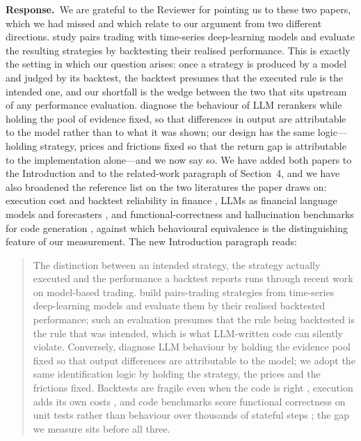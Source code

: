 \documentclass[11pt,a4paper]{article}
\newcommand{\response}{\par\noindent\textbf{Response.}\ }
\newenvironment{newtext}{\par\medskip\noindent\begin{quote}\small\color{blue!60!black}}{\end{quote}\par}
\begin{document}
\response We are grateful to the Reviewer for pointing us to these two papers, which we had missed and which relate to our argument from two different directions. \citet{yilmaz2026} study pairs trading with time-series deep-learning models and evaluate the resulting strategies by backtesting their realised performance. This is exactly the setting in which our question arises: once a strategy is produced by a model and judged by its backtest, the backtest presumes that the executed rule is the intended one, and our shortfall is the wedge between the two that sits upstream of any performance evaluation. \citet{arat2026} diagnose the behaviour of LLM rerankers while holding the pool of evidence fixed, so that differences in output are attributable to the model rather than to what it was shown; our design has the same logic---holding strategy, prices and frictions fixed so that the return gap is attributable to the implementation alone---and we now say so. We have added both papers to the Introduction and to the related-work paragraph of Section~4, and we have also broadened the reference list on the two literatures the paper draws on: execution cost and backtest reliability in finance \citep{almgren2001,harvey2016,gatev2006,bailey2014pseudo}, LLMs as financial language models and forecasters \citep{wu2023bloomberggpt,yang2023fingpt}, and functional-correctness and hallucination benchmarks for code generation \citep{chen2021humaneval,liu2023evalplus,jain2024livecodebench,tian2024codehalu,zhang2024hallucode}, against which behavioural equivalence is the distinguishing feature of our measurement. The new Introduction paragraph reads:
\begin{newtext}
The distinction between an intended strategy, the strategy actually executed and the performance a backtest reports runs through recent work on model-based trading. \citet{yilmaz2026} build pairs-trading strategies from time-series deep-learning models and evaluate them by their realised backtested performance; such an evaluation presumes that the rule being backtested is the rule that was intended, which is what LLM-written code can silently violate. Conversely, \citet{arat2026} diagnose LLM behaviour by holding the evidence pool fixed so that output differences are attributable to the model; we adopt the same identification logic by holding the strategy, the prices and the frictions fixed. Backtests are fragile even when the code is right \citep{bailey2014pseudo,bailey2016pbo,harvey2016}, execution adds its own costs \citep{perold1988implementation,almgren2001}, and code benchmarks score functional correctness on unit tests rather than behaviour over thousands of stateful steps \citep{chen2021humaneval,liu2023evalplus,jain2024livecodebench}; the gap we measure sits before all three.
\end{newtext}
\end{document}
